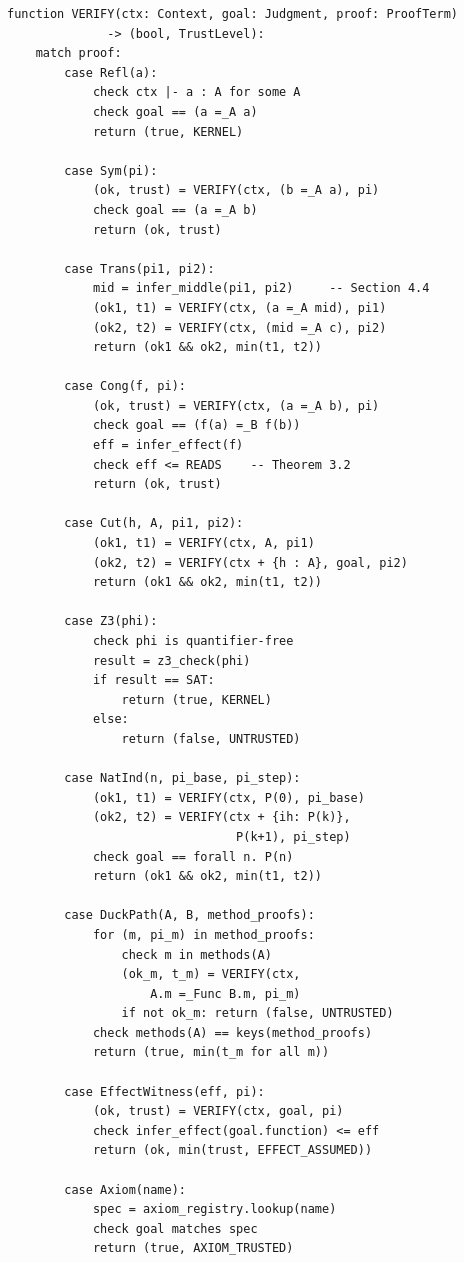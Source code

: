 \documentclass[11pt,a4paper]{report}
\theoremstyle{definition}
\theoremstyle{plain}
\begin{document}
\begin{lstlisting}[style=proof]
function VERIFY(ctx: Context, goal: Judgment, proof: ProofTerm)
              -> (bool, TrustLevel):
    match proof:
        case Refl(a):
            check ctx |- a : A for some A
            check goal == (a =_A a)
            return (true, KERNEL)

        case Sym(pi):
            (ok, trust) = VERIFY(ctx, (b =_A a), pi)
            check goal == (a =_A b)
            return (ok, trust)

        case Trans(pi1, pi2):
            mid = infer_middle(pi1, pi2)     -- Section 4.4
            (ok1, t1) = VERIFY(ctx, (a =_A mid), pi1)
            (ok2, t2) = VERIFY(ctx, (mid =_A c), pi2)
            return (ok1 && ok2, min(t1, t2))

        case Cong(f, pi):
            (ok, trust) = VERIFY(ctx, (a =_A b), pi)
            check goal == (f(a) =_B f(b))
            eff = infer_effect(f)
            check eff <= READS    -- Theorem 3.2
            return (ok, trust)

        case Cut(h, A, pi1, pi2):
            (ok1, t1) = VERIFY(ctx, A, pi1)
            (ok2, t2) = VERIFY(ctx + {h : A}, goal, pi2)
            return (ok1 && ok2, min(t1, t2))

        case Z3(phi):
            check phi is quantifier-free
            result = z3_check(phi)
            if result == SAT:
                return (true, KERNEL)
            else:
                return (false, UNTRUSTED)

        case NatInd(n, pi_base, pi_step):
            (ok1, t1) = VERIFY(ctx, P(0), pi_base)
            (ok2, t2) = VERIFY(ctx + {ih: P(k)},
                                P(k+1), pi_step)
            check goal == forall n. P(n)
            return (ok1 && ok2, min(t1, t2))

        case DuckPath(A, B, method_proofs):
            for (m, pi_m) in method_proofs:
                check m in methods(A)
                (ok_m, t_m) = VERIFY(ctx,
                    A.m =_Func B.m, pi_m)
                if not ok_m: return (false, UNTRUSTED)
            check methods(A) == keys(method_proofs)
            return (true, min(t_m for all m))

        case EffectWitness(eff, pi):
            (ok, trust) = VERIFY(ctx, goal, pi)
            check infer_effect(goal.function) <= eff
            return (ok, min(trust, EFFECT_ASSUMED))

        case Axiom(name):
            spec = axiom_registry.lookup(name)
            check goal matches spec
            return (true, AXIOM_TRUSTED)
\end{lstlisting}
\end{document}
